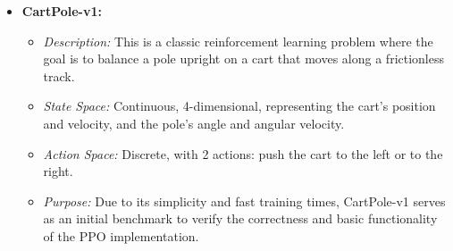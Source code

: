 \begin{itemize}
    \item \textbf{CartPole-v1:}
    \begin{itemize}
        \item \textit{Description:} This is a classic reinforcement learning problem where the goal is to balance a pole upright on a cart that moves along a frictionless track.
        \item \textit{State Space:} Continuous, 4-dimensional, representing the cart's position and velocity, and the pole's angle and angular velocity.
        \item \textit{Action Space:} Discrete, with 2 actions: push the cart to the left or to the right.
        \item \textit{Purpose:} Due to its simplicity and fast training times, CartPole-v1 serves as an initial benchmark to verify the correctness and basic functionality of the PPO implementation.
    \end{itemize}


\end{itemize}
